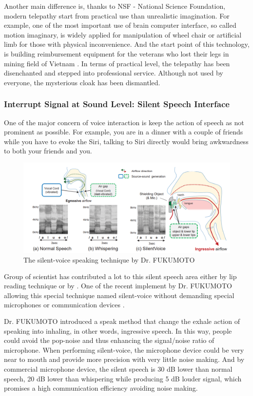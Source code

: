 \documentclass[a4paper]{article}
\begin{document}
Another main difference is, thanks to NSF - National Science Foundation, modern telepathy start from practical use than unrealistic imagination. For example, one of the most important use of brain computer interface, so called motion imaginary, is widely applied for manipulation of wheel chair or artificial limb for those with physical inconvenience. And the start point of this technology, is building reimbursement equipment for the veterans who lost their legs in mining field of Vietnam \autocite{zander2014towards}. In terms of practical level, the telepathy has been disenchanted and stepped into professional service. Although not used by everyone, the mysterious cloak has been dismantled. 

\subsubsection{Interrupt Signal at Sound Level: Silent Speech Interface}

One of the major concern of voice interaction is keep the action of speech as not prominent as possible. For example, you are in a dinner with a couple of friends while you have to evoke the Siri, talking to Siri directly would bring awkwardness to both your friends and you.

\begin{figure}
	\centering
	\includegraphics[width= \linewidth]{silentvoice}
	\caption{The silent-voice speaking technique by Dr. FUKUMOTO}
	\label{fig:P300}
\end{figure}

Group of scientist has contributed a lot to this silent speech area either by lip reading technique or by . One of the recent implement by Dr. FUKUMOTO allowing this special technique named silent-voice without demanding special microphones or communication devices \autocite{fukumoto2018silentvoice}.

Dr. FUKUMOTO introduced a speak method that change the exhale action of speaking into inhaling, in other words, ingressive speech. In this way, people could avoid the pop-noise and thus enhancing the signal/noise ratio of microphone. When performing silent-voice, the microphone device could be very near to mouth and provide more precision with very little noise making. And by commercial microphone device, the silent speech is 30 dB lower than normal speech, 20 dB lower than whispering while producing 5 dB louder signal, which promises a high communication efficiency avoiding noise making.  
\end{document}
